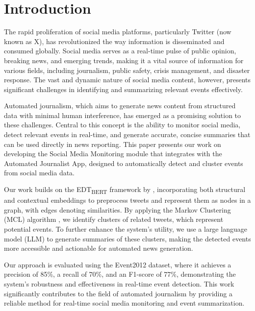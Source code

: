 \section{Introduction}
The rapid proliferation of social media platforms, particularly Twitter (now known as X), has revolutionized the way information is disseminated and consumed globally. Social media serves as a real-time pulse of public opinion, breaking news, and emerging trends, making it a vital source of information for various fields, including journalism, public safety, crisis management, and disaster response. The vast and dynamic nature of social media content, however, presents significant challenges in identifying and summarizing relevant events effectively.

Automated journalism, which aims to generate news content from structured data with minimal human interference, has emerged as a promising solution to these challenges. Central to this concept is the ability to monitor social media, detect relevant events in real-time, and generate accurate, concise summaries that can be used directly in news reporting. This paper presents our work on developing the Social Media Monitoring module that integrates with the Automated Journalist App, designed to automatically detect and cluster events from social media data.

Our work builds on the EDT\textsubscript{BERT} framework by \citet{edtbert}, incorporating both structural and contextual embeddings to preprocess tweets and represent them as nodes in a graph, with edges denoting similarities. By applying the Markov Clustering (MCL) algorithm \cite{mcl}, we identify clusters of related tweets, which represent potential events. To further enhance the system's utility, we use a large language model (LLM) to generate summaries of these clusters, making the detected events more accessible and actionable for automated news generation.

Our approach is evaluated using the Event2012 dataset, where it achieves a precision of 85\%, a recall of 70\%, and an F1-score of 77\%, demonstrating the system's robustness and effectiveness in real-time event detection. This work significantly contributes to the field of automated journalism by providing a reliable method for real-time social media monitoring and event summarization.

